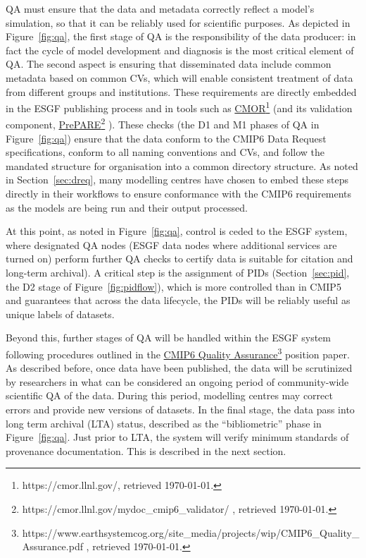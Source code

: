 \documentclass[gmd,manuscript]{copernicus}
\begin{document}
QA must ensure that the data and metadata correctly reflect a model's
simulation, so that it can be reliably used for scientific purposes.
As depicted in Figure~\ref{fig:qa}, the first stage of QA is the
responsibility of the data producer: in fact the cycle of model
development and diagnosis is the most critical element of QA. The
second aspect is ensuring that disseminated data include common
metadata based on common CVs, which will enable consistent treatment
of data from different groups and institutions. These requirements are
directly embedded in the ESGF publishing process and in tools such as
\href{https://cmor.llnl.gov/}{CMOR}\footnote{https://cmor.llnl.gov/,
  retrieved \today.} (and its validation component,
\href{https://cmor.llnl.gov/mydoc_cmip6_validator/
}{PrePARE}\footnote{https://cmor.llnl.gov/mydoc\_cmip6\_validator/ ,
  retrieved \today.} ). These checks (the D1 and M1 phases of QA in
Figure~\ref{fig:qa}) ensure that the data conform to the CMIP6 Data
Request specifications, conform to all naming conventions and CVs, and
follow the mandated structure for organisation into a common directory
structure. As noted in Section~\ref{sec:dreq}, many modelling centres
have chosen to embed these steps directly in their workflows to ensure
conformance with the CMIP6 requirements as the models are being run
and their output processed.

At this point, as noted in Figure~\ref{fig:qa}, control is ceded to
the ESGF system, where designated QA nodes (ESGF data nodes where
additional services are turned on) perform further QA checks to
certify data is suitable for citation and long-term archival). A
critical step is the assignment of PIDs (Section~\ref{sec:pid}, the D2
stage of Figure~\ref{fig:pidflow}), which is more controlled than in
CMIP5 and guarantees that across the data lifecycle, the PIDs will be
reliably useful as unique labels of datasets.

Beyond this, further stages of QA will be handled within the ESGF
system following procedures outlined in the
\href{https://www.earthsystemcog.org/site_media/projects/wip/CMIP6_Quality_Assurance.pdf
}{CMIP6 Quality
  Assurance}\footnote{https://www.earthsystemcog.org/site\_media/projects/wip/CMIP6\_Quality\_Assurance.pdf
  , retrieved \today.} position paper. As described before, once data
have been published, the data will be scrutinized by researchers in
what can be considered an ongoing period of community-wide scientific
QA of the data. During this period, modelling centres may correct
errors and provide new versions of datasets. In the final stage, the
data pass into long term archival (LTA) status, described as the
``bibliometric'' phase in Figure~\ref{fig:qa}. Just prior to LTA, the
system will verify minimum standards of provenance documentation. This
is described in the next section.
\end{document}

